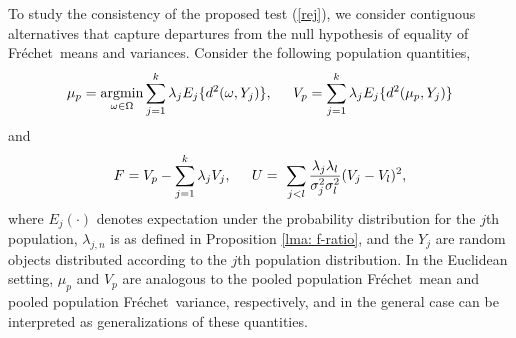 \documentclass[lineno]{biometrika}
\def\F{Fr\'{e}chet}
\def\vp{V_p}
\begin{document}
To study  the consistency of the proposed test  (\ref{rej}), we consider contiguous alternatives that  capture departures from the null hypothesis of equality of  \F \ means and variances. Consider the following population quantities, 
\begin{equation}
\label{eq: pooled}
\mu_{p}= \operatornamewithlimits{argmin}_{\omega \in \Omega} \sum_{j=1}^{k}
\lambda_{j} E_j\{d^2(\omega,Y_j)\}, \hspace{0.2 in}
\vp=  \sum_{j=1}^{k}
\lambda_{j} E_j\{d^2(\mu_{p},Y_j)\}
\end{equation} and
\begin{equation}
F=\vp-\sum_{j=1}^{k}\lambda_{j} V_j , \hspace{0.2 in} U= \ \sum_{j < l} \frac{\lambda_{j}\lambda_{l}}{\sigma_j^2 \sigma_l^2} (V_j-V_l)^2,
\end{equation} where $E_j(\cdot)$ denotes expectation under the probability distribution  for the $j$th population, $\lambda_{j,n}$ is as defined in Proposition \ref{lma: f-ratio}, and the $Y_j$ are random objects distributed according to the  $j$th  population distribution. In  the Euclidean setting, $\mu_p$ and $V_p$ are analogous to the pooled population \F \ mean and pooled population \F \ variance, respectively,  and in the general case can be interpreted as generalizations of these quantities. 
\end{document}
